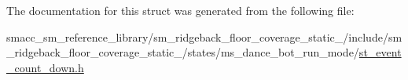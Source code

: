 The documentation for this struct was generated from the following file\+:\begin{DoxyCompactItemize}
\item 
smacc\+\_\+sm\+\_\+reference\+\_\+library/sm\+\_\+ridgeback\+\_\+floor\+\_\+coverage\+\_\+static\+\_/include/sm\+\_\+ridgeback\+\_\+floor\+\_\+coverage\+\_\+static\+\_/states/ms\+\_\+dance\+\_\+bot\+\_\+run\+\_\+mode/\hyperlink{sm__ridgeback__floor__coverage__static__1_2include_2sm__ridgeback__floor__coverage__static__1_2s16d89a2211d1236fc346b6548483dfbf}{st\+\_\+event\+\_\+count\+\_\+down.\+h}\end{DoxyCompactItemize}
